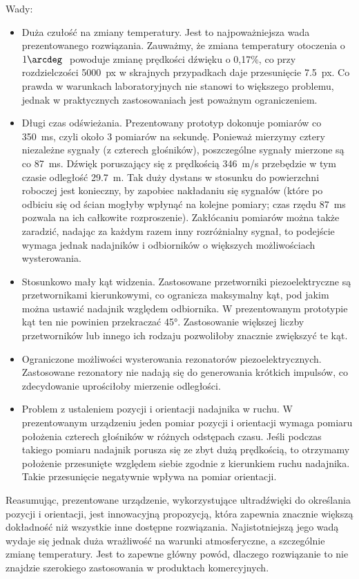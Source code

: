 Wady:
\begin{itemize}
 \item Duża czułość na zmiany temperatury. Jest to najpoważniejsza wada prezentowanego rozwiązania.
 Zauważmy, że zmiana temperatury otoczenia o $ 1\arcdeg\ $ powoduje zmianę prędkości dźwięku o 0,17\%,
 co przy rozdzielczości \SI{5000}{px} w skrajnych przypadkach daje przesunięcie \SI{7.5}{px}.
 Co prawda w warunkach laboratoryjnych nie stanowi to większego problemu, jednak w praktycznych zastosowaniach
 jest poważnym ograniczeniem.
 
 \item Długi czas odświeżania. Prezentowany prototyp dokonuje pomiarów co \SI{350}{ms}, czyli około 3 pomiarów 
 na sekundę. Ponieważ mierzymy cztery niezależne sygnały (z czterech głośników), poszczególne sygnały mierzone są co \SI{87}{ms}.
  Dźwięk poruszający się z prędkością \SI{346}{m/s}  przebędzie  w tym czasie odległość \SI{29.7}{m}.
 Tak duży dystans w stosunku do powierzchni roboczej jest konieczny, by zapobiec nakładaniu się sygnałów
 (które po odbiciu się od ścian mogłyby wpłynąć na kolejne pomiary; czas rzędu \SI{87}{ms} pozwala 
 na ich całkowite rozproszenie).
 Zakłócaniu pomiarów można także zaradzić, nadając za każdym razem inny rozróżnialny sygnał, to podejście 
 wymaga jednak nadajników i odbiorników o większych możliwościach wysterowania.
 
 \item Stosunkowo mały kąt widzenia. Zastosowane przetworniki piezoelektryczne są przetwornikami kierunkowymi, co 
 ogranicza  maksymalny kąt, pod jakim można ustawić nadajnik względem odbiornika. W prezentowanym 
 prototypie kąt ten nie powinien przekraczać \ang{45}. Zastosowanie większej liczby przetworników lub innego ich rodzaju
 pozwoliłoby znacznie zwiększyć te kąt.

 \item Ograniczone możliwości wysterowania rezonatorów piezoelektrycznych. 
 Zastosowane rezonatory nie nadają się do generowania krótkich impulsów, co zdecydowanie uprościłoby mierzenie odległości.
 
 \item Problem z ustaleniem pozycji i orientacji nadajnika w ruchu. W prezentowanym urządzeniu 
 jeden pomiar pozycji i orientacji wymaga pomiaru położenia czterech głośników w różnych odstępach czasu.
 Jeśli podczas takiego pomiaru nadajnik porusza się ze zbyt dużą prędkością, to otrzymamy położenie
 przesunięte względem siebie zgodnie z kierunkiem ruchu nadajnika. Takie przesunięcie negatywnie wpływa na 
 pomiar orientacji. 
\end{itemize}


Reasumując, prezentowane urządzenie, wykorzystujące ultradźwięki do określania pozycji i orientacji,
jest innowacyjną propozycją, która zapewnia znacznie większą dokładność niż wszystkie inne dostępne rozwiązania.
Najistotniejszą jego wadą wydaje się jednak duża wrażliwość na warunki atmosferyczne, a szczególnie zmianę temperatury.
Jest to zapewne główny powód, dlaczego rozwiązanie to nie znajdzie  szerokiego zastosowania w produktach komercyjnych.



